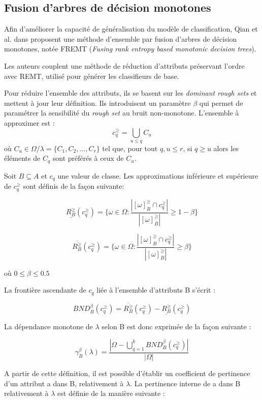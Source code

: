 \documentclass[a4paper]{article}
\begin{document}
\subsection{Fusion d'arbres de décision monotones} 
Afin d'améliorer la capacité de généralisation du modèle de classification, Qian
et al. dans \cite{qian-fusing} proposent une méthode d'ensemble par fusion
d'arbres de décision monotones, notée FREMT (\emph{Fusing rank entropy based
monotonic decision trees}).

Les auteurs couplent une méthode de réduction d'attributs préservant l'ordre
avec REMT, utilisé pour générer les classifieurs de base.

Pour réduire l'ensemble des attributs, ils se basent sur les \emph{dominant
rough sets} et mettent à jour leur définition. Ils introduisent un paramètre
$\beta$ qui permet de paramétrer la sensibilité du \emph{rough set} au bruit
non-monotone. L'ensemble à approximer est : 
$$c^{\geq}_q = \bigcup_{u \leq q} C_u$$
où $C_u \in \Omega / \lambda = \{C_1, C_2,...,C_r\}$ tel que, pour tout $q, u \leq r$, si $q
\geq u$ alors les éléments de $C_q$ sont préférés à ceux de $C_u$.

\noindent Soit $B \subseteq A$ et $c_q$ une valeur de classe. Les approximations
inférieure et supérieure de $c^{\geq}_q$ sont définis de la façon suivante:

$$ \underline{R^{\geq}_B}(c^{\geq}_q) = \{\omega \in \Omega :
\frac{|[\omega]^{\geq}_B \cap c^{\geq}_q|}{|[\omega]^{\geq}_B|} \geq 1 -
\beta\}$$

$$ \overline{R^{\geq}_B}(c^{\geq}_q) = \{\omega \in \Omega :
\frac{|[\omega]^{\geq}_B \cap c^{\geq}_q|}{|[\omega]^{\geq}_B|} \geq \beta\}$$

\noindent où $0 \leq \beta \leq 0.5$

\noindent La frontière ascendante de $c_q$ liée à l'ensemble d'attributs B s'écrit :

$$ BND^{\beta}_B(c^{\geq}_q) = \overline{R^{\geq}_B}(c^{\geq}_q) - \underline{R^{\geq}_B}(c^{\geq}_q)$$

\noindent La dépendance monotone de $\lambda$ selon B est donc exprimée de la façon
suivante :

$$ \gamma^{\beta}_B(\lambda) = \frac{|\Omega - \bigcup_{q=1}^k
BND^{\beta}_B(c^{\geq}_q)|}{|\Omega|}$$

\noindent A partir de cette définition, il est possible d'établir un coefficient de
pertinence d'un attribut a dans B, relativement à $\lambda$. La pertinence
interne de a dans B relativement à $\lambda$ est définie de la manière suivante
:
\end{document}
